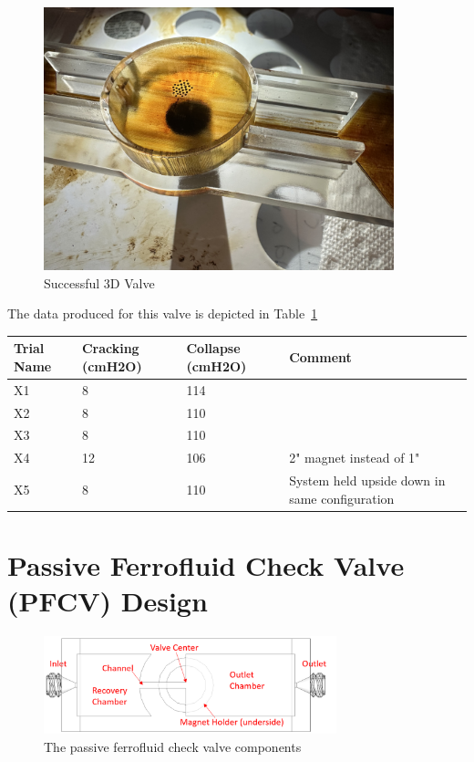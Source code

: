 \documentclass{asme2ej}
\begin{document}
\begin{figure}[h]
\centerline{\includegraphics[width=4in,angle=180]{figure/3DDesignCheckValve.jpeg}}
\caption{Successful 3D Valve}
\label{fig:successful}
\end{figure}

The data produced for this valve is depicted in Table~\ref{tab:successful3d}

\begin{table}[]
  \label{tab:successful3d}
  \begin{tabular}{l|l|l|l}
    \hline
    Trial Name & Cracking (cmH2O) & Collapse (cmH2O) &	Comment \\
    \hline
    \hline
     X1 & 8 & 114 &   \\
    \hline
     X2 & 8 & 110  &    \\
    \hline
     X3 & 8 & 110 &    \\
    \hline
     X4 & 12 & 106 & 2" magnet instead of 1"  \\
    \hline
     X5 & 8 & 110 &  System held upside down in same configuration \\
    \hline
\end{tabular}
\end{table}


\section{Passive Ferrofluid Check Valve (PFCV) Design}
\begin{figure}
\centerline{\includegraphics[width=3.34in]{figure/Figure1.png}}
\caption{The passive ferrofluid check valve components}
\label{fig_components}
\end{figure}
\end{document}
